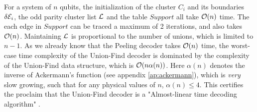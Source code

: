For a system of $n$ qubits, the initialization of the cluster $C_i$ and its boundaries $\delta\mathcal{E}_i$, the odd parity cluster list $\mathcal{L}$ and the table $Support$ all take $\mathcal{O}(n)$ time. The each edge in $Support$ can be traced a maximum of 2 iterations, and also takes $\mathcal{O}(n)$. Maintaining $\mathcal{L}$ is proportional to the number of unions, which is limited to $n-1$. As we already know that the Peeling decoder takes $\mathcal{O}(n)$ time, the worst-case time complexity of the Union-Find decoder is dominated by the complexity of the Union-Find data structure, which is $\mathcal{O}(n\alpha(n))$. Here $\alpha(n)$ denotes the inverse of Ackermann's function (see appendix \ref{ap:ackermann}), which is \emph{very} slow growing, such that for any physical values of $n$, $\alpha(n) \leq 4$. This certifies the proclaim that the Union-Find decoder is a "Almost-linear time decoding algorithm" \cite{delfosse2017almost}. 
